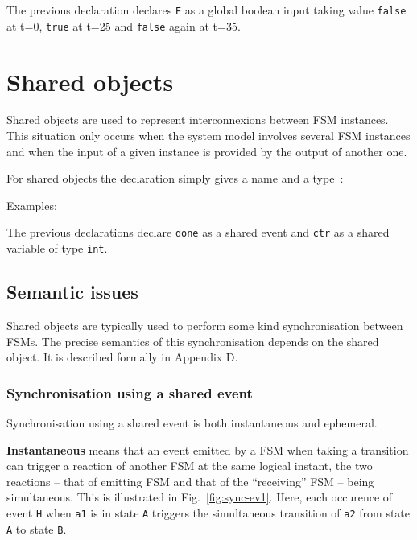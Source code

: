 The previous declaration declares \verb|E| as a global boolean input taking value \texttt{false} at
t=0, \texttt{true} at t=25 and \texttt{false} again at t=35.

\section{Shared objects}
\label{sec:shared}

Shared objects are used to represent interconnexions between FSM instances. This situation only
occurs when the system model involves several FSM instances and when the input of a given instance
is provided by the output of another one.

\step For shared objects the declaration simply gives a name and a type~:

\begin{center}
\end{center}

\medskip
Examples:

\begin{center}

\end{center}

The previous declarations declare \verb|done| as a shared event and \texttt{ctr} as a shared
variable of type \texttt{int}.

\subsection*{Semantic issues}

\medskip
Shared objects are typically used to perform some kind synchronisation between FSMs. The precise semantics
of this synchronisation depends on the shared object. It is described formally in Appendix D.

\subsubsection*{Synchronisation using a shared event}
\label{sec:synchr-using-shar}

Synchronisation using a shared event is both instantaneous and ephemeral.

\textbf{Instantaneous} means that an event emitted by a FSM when taking a
transition can trigger a reaction of another FSM at the same logical instant, the two reactions -- that of
emitting FSM and that of the ``receiving'' FSM -- being simultaneous. 
This is illustrated in Fig.~\ref{fig:sync-ev1}. Here, each occurence of event \texttt{H} when
\texttt{a1} is in state \texttt{A} triggers the simultaneous transition of \texttt{a2} from state
\texttt{A} to state \texttt{B}.

